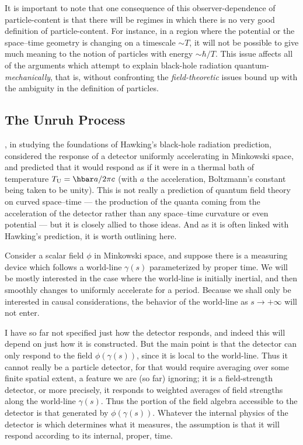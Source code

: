 \documentclass[
%
draft    %
,numberedheadings 
,bibliocites
  ]
  {aipproc}
\begin{document}
It is important to note that one consequence of this observer-dependence of particle-content is that there will be regimes in which there is no very good definition of particle-content.  For instance, in a region where the potential or the space--time geometry is changing on a timescale $\sim T$, it will not be possible to give much meaning to the notion of particles with energy $\sim\hbar /T$.  
This issue affects all of the arguments which attempt to explain black-hole radiation quantum-{\em mechanically}, that is, without confronting the {\em field-theoretic} issues bound up with the ambiguity in the definition of particles.


\subsection{The Unruh Process}

\citet{Unruh:1976db}, in studying the foundations of Hawking's black-hole radiation prediction, considered the response of a detector uniformly accelerating in Minkowski space, and predicted that it would respond as if it were in a thermal bath of temperature $T_{\rm U}=\hbar a/2\pi c$ (with $a$ the acceleration, Boltzmann's constant being taken to be unity).  This is not really a prediction of quantum field theory on curved space--time --- the production of the quanta coming from the acceleration of the detector rather than any space--time curvature or even potential --- but it is closely allied to those ideas.  And as it is often linked with Hawking's prediction, it is worth outlining here.



Consider a scalar field $\phi$ in Minkowski space, and suppose there is a measuring device which follows a world-line $\gamma (s)$ parameterized by proper time.  We will be mostly interested in the case where the world-line is initially inertial, and then smoothly changes to uniformly accelerate for a period.  Because we shall only be interested in causal considerations, the behavior of the world-line as $s\to +\infty$ will not enter.

I have so far not specified just how the detector responds, and indeed this will depend on just how it is constructed.  But the main point is that the detector can only respond to the field $\phi (\gamma (s))$, since it is local to the world-line.  Thus it cannot really be a particle detector, for that would require averaging over some finite spatial extent, a feature we are (so far) ignoring; it is a field-strength detector, or more precisely, it responds to weighted averages of field strengths along the world-line $\gamma (s)$.
Thus the portion of the field algebra accessible to the detector is that generated by $\phi (\gamma (s))$.  Whatever the internal physics of the detector is which determines what it measures, the assumption is that it will respond according to its internal, proper, time.
\end{document}
